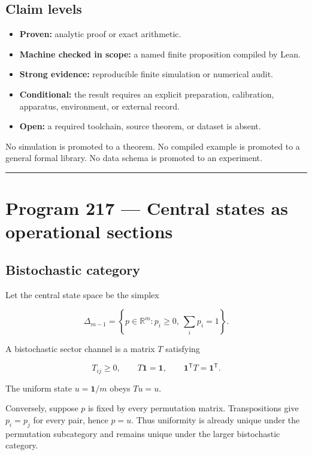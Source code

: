 \documentclass[11pt,a4paper,openany]{report}
\begin{document}
\section{Claim levels}

\begin{itemize}
\item 
\textbf{Proven:} analytic proof or exact arithmetic.

\item 
\textbf{Machine checked in scope:} a named finite proposition compiled by Lean.

\item 
\textbf{Strong evidence:} reproducible finite simulation or numerical audit.

\item 
\textbf{Conditional:} the result requires an explicit preparation, calibration, apparatus, environment, or external record.

\item 
\textbf{Open:} a required toolchain, source theorem, or dataset is absent.

\end{itemize}

No simulation is promoted to a theorem. No compiled example is promoted to a general formal library. No data schema is promoted to an experiment.

\par\medskip\hrule\medskip

\chapter{Program 217 --- Central states as operational sections}

\section{Bistochastic category}

Let the central state space be the simplex

\[
\Delta_{m-1}
=
\left\{p\in\mathbb R^m:
p_i\ge0,\ \sum_i p_i=1
\right\}.
\]

A bistochastic sector channel is a matrix \(T\) satisfying

\[
T_{ij}\ge0,
\qquad
T\mathbf1=\mathbf1,
\qquad
\mathbf1^\mathsf TT=\mathbf1^\mathsf T.
\]

The uniform state \(u=\mathbf1/m\) obeys \(Tu=u\).

Conversely, suppose \(p\) is fixed by every permutation matrix. Transpositions give \(p_i=p_j\) for every pair, hence \(p=u\). Thus uniformity is already unique under the permutation subcategory and remains unique under the larger bistochastic category.
\end{document}
